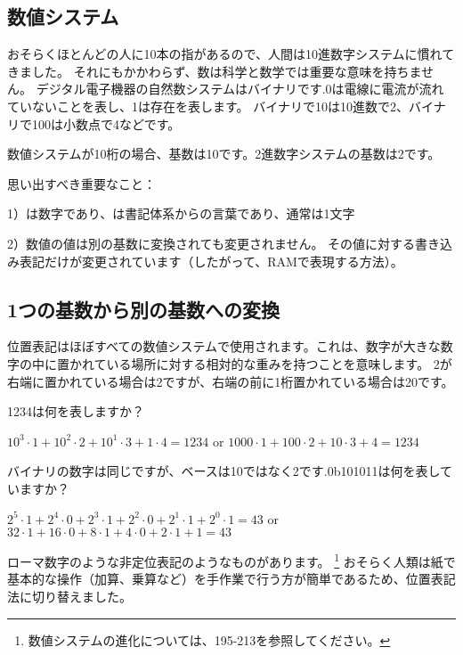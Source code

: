\subsection{数値システム}

おそらくほとんどの人に10本の指があるので、人間は10進数字システムに慣れてきました。 それにもかかわらず、数は科学と数学では重要な意味を持ちません。 デジタル電子機器の自然数システムはバイナリです.0は電線に電流が流れていないことを表し、1は存在を表します。 バイナリで10は10進数で2、バイナリで100は小数点で4などです。

数値システムが10桁の場合、基数は10です。2進数字システムの基数は2です。

思い出すべき重要なこと：

1）は数字であり、は書記体系からの言葉であり、通常は1文字

2）数値の値は別の基数に変換されても変更されません。 その値に対する書き込み表記だけが変更されています（したがって、\ac{RAM}で表現する方法）。

\subsection{1つの基数から別の基数への変換}

位置表記はほぼすべての数値システムで使用されます。これは、数字が大きな数字の中に置かれている場所に対する相対的な重みを持つことを意味します。
2が右端に置かれている場合は2ですが、右端の前に1桁置かれている場合は20です。

1234は何を表しますか？

$10^3 \cdot 1 + 10^2 \cdot 2 + 10^1 \cdot 3 + 1 \cdot 4 = 1234$ or
$1000 \cdot 1 + 100 \cdot 2 + 10 \cdot 3 + 4 = 1234$

バイナリの数字は同じですが、ベースは10ではなく2です.0b101011は何を表していますか？

$2^5 \cdot 1 + 2^4 \cdot 0 + 2^3 \cdot 1 + 2^2 \cdot 0 + 2^1 \cdot 1 + 2^0 \cdot 1 = 43$ or
$32 \cdot 1 + 16 \cdot 0 + 8 \cdot 1 + 4 \cdot 0 + 2 \cdot 1 + 1 = 43$

ローマ数字のような非定位表記のようなものがあります。
\footnote{数値システムの進化については、195-213を参照してください。}
おそらく人類は紙で基本的な操作（加算、乗算など）を手作業で行う方が簡単であるため、位置表記法に切り替えました。

